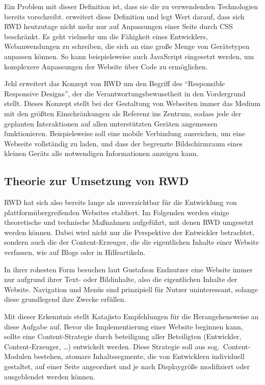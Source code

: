 Ein Problem mit dieser Definition ist, dass sie die zu verwendenden Technologien bereits vorschreibt.
\autocite[S. 28]{Laati.ImplementingResponsiveDesignInIndustrialDashboardEditor.2017} erweitert diese Definition und legt Wert darauf, dass sich \ac{RWD} heutzutage nicht mehr nur auf Anpassungen einer Seite durch \ac{CSS} beschränkt.
Es geht vielmehr um die Fähigkeit eines Entwicklers, Webanwendungen zu schreiben, die sich an eine große Menge von Gerätetypen anpassen können.
So kann beispielsweise auch JavaScript eingesetzt werden, um komplexere Anpassungen der Website über Code zu ermöglichen.

Jehl \autocite{Jehl.ResponsibleResponsiveWebDesign.2014} erweitert das Konzept von \ac{RWD} um den Begriff des "`Responsible Responsive Designs"', der die Verantwortungsbewusstheit in den Vordergrund stellt.
Dieses Konzept stellt bei der Gestaltung von Webseiten immer das Medium mit den größten Einschränkungen als Referenz ins Zentrum, sodass jede der geplanten Interaktionen auf allen unterstützten Geräten angemessen funktionieren.
Beispielsweise soll eine mobile Verbindung ausreichen, um eine Webseite vollständig zu laden, und dass der begrenzte Bildschirmraum eines kleinen Geräts alle notwendigen Informationen anzeigen kann.


\subsection{Theorie zur Umsetzung von \ac{RWD}}

\acl{RWD} hat sich also bereits lange als unverzichtbar für die Entwicklung von plattformübergreifenden Websites etabliert.
Im Folgenden werden einige theoretische und technische Maßnahmen aufgeführt, mit denen \ac{RWD} umgesetzt werden können.
Dabei wird nicht nur die Perspektive der Entwickler betrachtet, sondern auch die der Content-Erzeuger, die die eigentlichen Inhalte einer Website verfassen, wie auf Blogs oder in Hilfeartikeln.

In ihrer rohesten Form besuchen laut Gustafson \autocite[Kap. 1]{Gustafson.AdaptiveWebDesign.2011} Endnutzer eine Website immer nur aufgrund ihrer Text- oder Bildinhalte, also die eigentlichen Inhalte der Website.
Navigation und Menüs sind prinzipiell für Nutzer uninteressant, solange diese grundlegend ihre Zwecke erfüllen.

Mit dieser Erkenntnis stellt Katajisto \autocite[S. 4]{Katajisto.CreatingSupportContent.2015} Empfehlungen für die Herangehensweise an diese Aufgabe auf.
Bevor die Implementierung einer Website beginnen kann, sollte eine Content-Strategie durch beteiligung aller Beteiligten (Entwickler, Content-Erzeuger, \ldots) entwickelt werden.
Diese Strategie soll aus sog.\ Content-Modulen bestehen, atomare Inhaltssegmente, die von Entwicklern individuell gestaltet, auf einer Seite angeordnet und je nach Displaygröße modifiziert oder ausgeblendet werden können.

